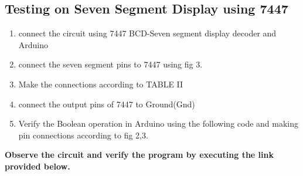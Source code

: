\documentclass[journal,12pt,twocolumn]{IEEEtran}
\begin{document}
\subsection{Testing on Seven Segment Display using 7447}
\begin{enumerate}
\item connect the circuit using 7447 BCD-Seven segment display decoder and Arduino
\item  connect the seven segment pins to 7447 using fig 3.
\item  Make the connections according to TABLE II \\

\begin{table}[!h]
\centering
\caption{}
\label{table:7447_disp}
\end{table}
\item connect the output pins of 7447 to Ground(Gnd)
\item Verify the Boolean operation in Arduino using the following code and making
pin connections according to fig 2,3.
\end{enumerate}

\textbf{Observe the circuit and verify the program by executing the link provided below.}\\
\begin{center}
\end{center}
\end{document}
